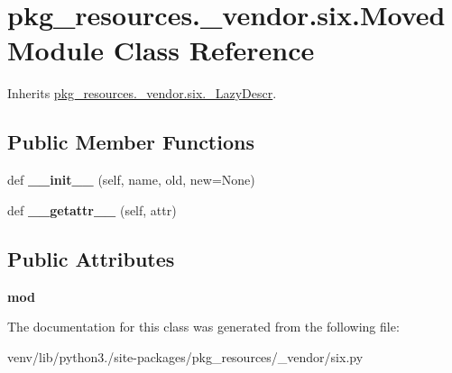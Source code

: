\hypertarget{classpkg__resources_1_1__vendor_1_1six_1_1_moved_module}{}\section{pkg\+\_\+resources.\+\_\+vendor.\+six.\+Moved\+Module Class Reference}
\label{classpkg__resources_1_1__vendor_1_1six_1_1_moved_module}


Inherits \hyperlink{classpkg__resources_1_1__vendor_1_1six_1_1___lazy_descr}{pkg\+\_\+resources.\+\_\+vendor.\+six.\+\_\+\+Lazy\+Descr}.

\subsection*{Public Member Functions}
\begin{DoxyCompactItemize}
\item 
\mbox{\label{classpkg__resources_1_1__vendor_1_1six_1_1_moved_module_a323145e957f8d3e8e46530ee3f42d6fc}} 
def {\bfseries \+\_\+\+\_\+init\+\_\+\+\_\+} (self, name, old, new=None)
\item 
\mbox{\label{classpkg__resources_1_1__vendor_1_1six_1_1_moved_module_a58d854cfd599bfeba5665526657bdae6}} 
def {\bfseries \+\_\+\+\_\+getattr\+\_\+\+\_\+} (self, attr)
\end{DoxyCompactItemize}
\subsection*{Public Attributes}
\begin{DoxyCompactItemize}
\item 
\mbox{\label{classpkg__resources_1_1__vendor_1_1six_1_1_moved_module_afd4ad4dd5f0f3d5781ad41b00d498771}} 
{\bfseries mod}
\end{DoxyCompactItemize}


The documentation for this class was generated from the following file\+:\begin{DoxyCompactItemize}
\item 
venv/lib/python3./site-\/packages/pkg\+\_\+resources/\+\_\+vendor/six.\+py\end{DoxyCompactItemize}
